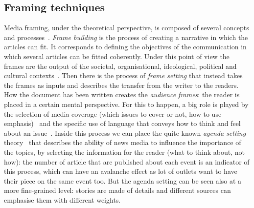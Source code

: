 \subsection{Framing techniques}
\label{ssec:lit_framing_theory}


Media framing, under the theoretical perspective, is composed of several concepts and processes~\cite{scheufele2007framing}.
\textit{Frame building} is the process of creating a narrative in which the articles can fit. It corresponds to defining the objectives of the communication in which several articles can be fitted coherently. Under this point of view the frames are the output of the societal, organisational, ideological, political and cultural contexts~\cite{scheufele1999framing}.
Then there is the process of \textit{frame setting} that instead takes the frames as inputs and describes the transfer from the writer to the readers. How the document has been written creates the \emph{audience frames}: the reader is placed in a certain mental perspective. For this to happen, a big role is played by the selection of media coverage (which issues to cover or not, how to use emphasis)~\cite{iyengar1994anyone} and the specific use of language that conveys how to think and feel about an issue~\cite{bryant2012fundamentals}.
Inside this process we can place the quite known \emph{agenda setting} theory~\cite{mccombs1972agenda} that describes the ability of news media to influence the importance of the topics, by selecting the information for the reader (what to think about, not how): %
the number of article that are published about each event is an indicator of this process, which can have an avalanche effect as lot of outlets want to have their piece on the same event too.
But the agenda setting can be seen also at a more fine-grained level: stories are made of details and different sources can emphasise them with different weights.

